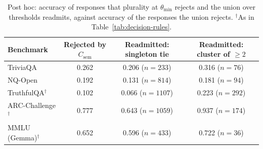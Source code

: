 \begin{table}[h]
\centering
\footnotesize
\setlength{\tabcolsep}{3pt}
\begin{tabular}{lccc}
\toprule
Benchmark & Rejected by $C_{\text{sem}}$ & Readmitted: singleton tie & Readmitted: cluster of $\geq 2$ \\
\midrule
TriviaQA & 0.262 & 0.206 ($n=233$) & 0.316 ($n=76$) \\
NQ-Open & 0.192 & 0.131 ($n=814$) & 0.181 ($n=94$) \\
TruthfulQA$^\dagger$ & 0.102 & 0.066 ($n=1107$) & 0.223 ($n=292$) \\
ARC-Challenge$^\dagger$ & 0.777 & 0.643 ($n=1059$) & 0.937 ($n=174$) \\
MMLU (Gemma)$^\dagger$ & 0.652 & 0.596 ($n=433$) & 0.722 ($n=36$) \\
\bottomrule
\end{tabular}
\caption{Post hoc: accuracy of responses that plurality at $\theta_{\min}$ rejects and the union over thresholds readmits, against accuracy of the responses the union rejects. $^\dagger$As in Table~\ref{tab:decision-rules}.}
\label{tab:readmitted}
\end{table}
